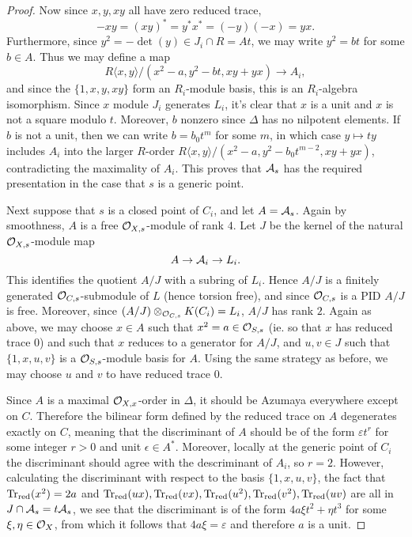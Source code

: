 \begin{proof}
Now since $x,y,xy$ all have zero reduced trace,
$$-xy = (xy)^* = y^*x^* = (-y)(-x) = yx.$$
Furthermore, since $y^2 = -\det(y)\in J_i\cap R = At$, we may write $y^2 = bt$ for some $b\in A$.  Thus we may define a map
$$R\langle x,y\rangle/(x^2-a,y^2-bt,xy+yx)\rightarrow A_i,$$
and since the $\{1,x,y,xy\}$ form an $R_i$-module basis, this is an $R_i$-algebra isomorphism.  Since $x$ module $J_i$ generates $L_i$, it's clear that $x$ is a unit and $x$ is not a square modulo $t$.  Moreover, $b$ nonzero since $\Delta$ has no nilpotent elements.  If $b$ is not a unit, then we can write $b = b_0t^m$ for some $m$, in which case $y\mapsto ty$ includes $A_i$ into the larger $R$-order $R\langle x,y\rangle/(x^2-a,y^2-b_0t^{m-2},xy+yx)$, contradicting the maximality of $A_i$.  This proves that $\mathcal{A}_s$ has the required presentation in the case that $s$ is a generic point.

Next suppose that $s$ is a closed point of $C_i$, and let $A = \mathcal{A}_s$.  Again by smoothness, $A$ is a free $\mathcal{O}_{X,s}$-module of rank $4$.  Let $J$ be the kernel of the natural $\mathcal{O}_{X,s}$-module map
$$A\rightarrow\mathcal{A}_i\rightarrow L_i.$$
This identifies the quotient $A/J$ with a subring of $L_i$.  Hence $A/J$ is a finitely generated $\mathcal{O}_{C,s}$-submodule of $L$ (hence torsion free), and since $\mathcal{O}_{C,s}$ is a PID $A/J$ is free.  Moreover, since $(A/J)\otimes_{\mathcal{O}_{C,s}} K(C_i) = L_i$, $A/J$ has rank $2$.  Again as above, we may choose $x\in A$ such that $x^2 = a\in\mathcal{O}_{S,s}$ (ie. so that $x$ has reduced trace $0$) and such that $x$ reduces to a generator for $A/J$, and $u,v\in J$ such that $\{1,x,u,v\}$ is a $\mathcal{O}_{S,s}$-module basis for $A$.  Using the same strategy as before, we may choose $u$ and $v$ to have reduced trace $0$.

Since $A$ is a maximal $\mathcal{O}_{X,x}$-order in $\Delta$, it should be Azumaya everywhere except on $C$.  Therefore the bilinear form defined by the reduced trace on $A$ degenerates exactly on $C$, meaning that the discriminant of $A$ should be of the form $\varepsilon t^r$ for some integer $r>0$ and unit $\epsilon\in A^*$.  Moreover, locally at the generic point of $C_i$ the discriminant should agree with the descriminant of $A_i$, so $r=2$. However, calculating the discriminant with respect to the basis $\{1,x,u,v\}$, the fact that $\textnormal{Tr}_{\text{red}}(x^2) = 2a$ and $\textnormal{Tr}_{\text{red}}(ux),\textnormal{Tr}_{\text{red}}(vx),\textnormal{Tr}_{\text{red}}(u^2),\textnormal{Tr}_{\text{red}}(v^2),\textnormal{Tr}_{\text{red}}(uv)$ are all in $J\cap \mathcal{A}_s = t\mathcal{A}_s$, we see that the discriminant is of the form $4a\xi t^2 + \eta t^3$ for some $\xi,\eta\in \mathcal{O}_X$, from which it follows that $4a\xi = \varepsilon$ and therefore $a$ is a unit.


\end{proof}
